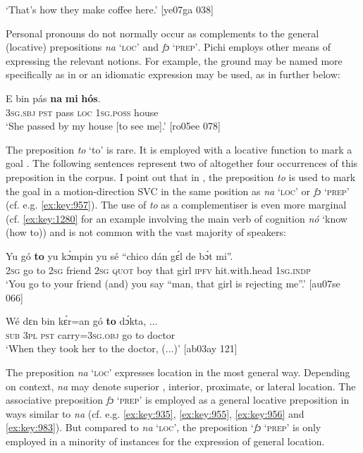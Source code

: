 \glt ‘That’s how they make coffee here.’ [ye07ga 038]
\z

Personal pronouns do not normally occur as complements to the general (locative) prepositions \textit{na} ‘\textsc{loc’} and \textit{fɔ} ‘\textsc{prep’}. Pichi employs other means of expressing the relevant notions. For example, the ground may be named more specifically as in  or an idiomatic expression may be used, as in  further below: 


\ea%
    \label{ex:key:907}
    \gll E    bin  pás  \textbf{na}  \textbf{mi}    \textbf{hós}.\\
\textsc{3sg.sbj}  \textsc{pst}  pass  \textsc{loc}  \textsc{1sg.poss}  house\\

\glt ‘She passed by my house [to see me].’ [ro05ee 078]
\z

The preposition \textit{to} ‘to’ is rare. It is employed with a locative function to mark a goal . The following sentences represent two of altogether four occurrences of this preposition in the corpus. I point out that in , the preposition \textit{to} is used to mark the goal in a motion-direction SVC in the same position as \textit{na} ‘\textsc{loc}’ or \textit{fɔ} ‘\textsc{prep}’ (cf. e.g. \ref{ex:key:957}). The use of \textit{to} as a complementiser is even more marginal (cf. \ref{ex:key:1280} for an example involving the main verb of cognition \textit{nó} ‘know (how to)) and is not common with the vast majority of speakers:


\ea%
    \label{ex:key:908}
    \gll Yu  gó  \textbf{to}  yu  kɔ́mpin  yu  sé    “chico  dán  gɛ́l  de
    bɔ́t        mi”.\\
    \textsc{2sg}  go  to  \textsc{2sg}  friend  \textsc{2sg}  \textsc{quot}    boy    that  girl  \textsc{ipfv} 
hit.with.head    \textsc{1sg.indp}\\

\glt ‘You go to your friend (and) you say “man, that girl is rejecting me”.’ [au07se 066]
\z


\ea%
    \label{ex:key:909}
    \gll Wé  dɛn  bin  kɛ́r=an    gó  \textbf{to}  dɔ́kta,  \op...\cp{}\\
\textsc{sub}  \textsc{3pl}  \textsc{pst}  carry=\textsc{3sg.obj}  go  to  doctor\\

\glt ‘When they took her to the doctor, (...)’ [ab03ay 121]
\z

The preposition \textit{na} ‘\textsc{loc}’ expresses location in the most general way. Depending on context, \textit{na} may denote superior , interior, proximate, or lateral  location. The associative preposition \textit{fɔ} ‘\textsc{prep}’ is employed as a general locative preposition in ways similar to \textit{na} (cf. e.g. \ref{ex:key:935}, \ref{ex:key:955}, \ref{ex:key:956} and \ref{ex:key:983}). But compared to \textit{na} ‘\textsc{loc}’, the preposition ‘\textit{fɔ} ‘\textsc{prep}’ is only employed in a minority of instances for the expression of general location.

